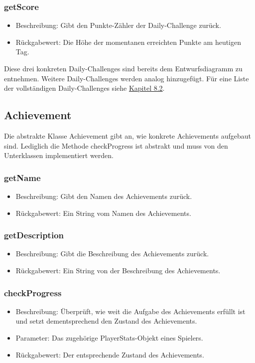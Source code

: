 \documentclass[a4paper]{scrreprt}
\begin{document}
	\subsubsection{getScore}
	\begin{itemize}
		\item Beschreibung: Gibt den Punkte-Zähler der Daily-Challenge zurück.
		\item Rückgabewert: Die Höhe der momentanen erreichten Punkte am heutigen Tag.
	\end{itemize}

	\vspace{8pt}

	Diese drei konkreten Daily-Challenges sind bereits dem Entwurfsdiagramm zu entnehmen. Weitere Daily-Challenges werden analog hinzugefügt. Für eine Liste der vollständigen Daily-Challenges siehe \hyperlink{Daily}{Kapitel 8.2}. \\

	\vspace{8pt}

	\subsection{Achievement}
	Die abstrakte Klasse Achievement gibt an, wie konkrete Achievements aufgebaut sind. Lediglich die Methode checkProgress ist abstrakt und muss von den Unterklassen implementiert werden.

	\subsubsection{getName}
	\begin{itemize}
		\item Beschreibung: Gibt den Namen des Achievements zurück.
		\item Rückgabewert: Ein String vom Namen des Achievements.
	\end{itemize}
	\subsubsection{getDescription}
	\begin{itemize}
		\item Beschreibung: Gibt die Beschreibung des Achievements zurück.
		\item Rückgabewert: Ein String von der Beschreibung des Achievements.
	\end{itemize}
	\subsubsection{checkProgress}
	\begin{itemize}
		\item Beschreibung: Überprüft, wie weit die Aufgabe des Achievements erfüllt ist und setzt dementsprechend den Zustand des Achievements.
		\item Parameter: Das zugehörige PlayerStats-Objekt eines Spielers.
		\item Rückgabewert: Der entsprechende Zustand des Achievements.
	\end{itemize}
\end{document}

